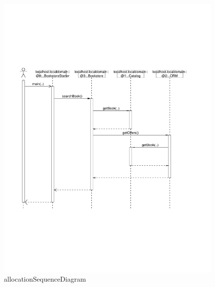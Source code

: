 	\begin{figure}[H]
		\centering
		\includegraphics[height=0.5\textheight]{images/allocationSequenceDiagram}
		\caption{allocationSequenceDiagram}
	\end{figure}
